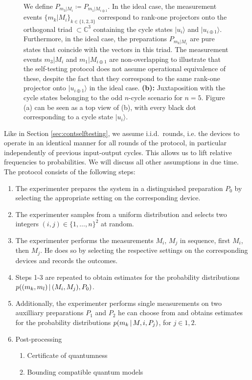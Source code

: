 \begin{figure}
{\vspace*{0.7em} 
We define $P_{m_3\vert M_i}\coloneqq P_{m_1\vert M_{i\oplus 1}}$. In the ideal case, the measurement events $\{m_k\vert M_i\}_{k\in\{1,2,3\}}$ correspond to rank-one projectors onto the orthogonal triad $\subset \mathbb{C}^3$ containing the cycle states $\vert u_i\rangle$ and $\vert u_{i\oplus 1}\rangle$. Furthermore, in the ideal case, the preparations $P_{m_k\vert M_i}$ are pure states that coincide with the vectors in this triad. The measurement events $m_3\vert M_i$ and $m_1\vert M_{i\oplus 1}$ are non-overlapping to illustrate that the self-testing protocol does not assume operational equivalence of these, despite the fact that they correspond to the same rank-one projector onto $\vert u_{i\oplus 1}\rangle$ in the ideal case. \textbf{(b):} Juxtaposition with the cycle states belonging to the odd $n$-cycle scenario for $n=5$. Figure (a) can be seen as a top view of (b), with every black dot corresponding to a cycle state $\vert u_i\rangle$.
}
\label{fig:ncycleselftesting}
\end{figure}

Like in Section \ref{sec:contselftesting}, we assume i.i.d.\ rounds, i.e. the devices to operate in an identical manner for all rounds of the protocol, in particular independently of previous input-output cycles. This allows us to lift relative frequencies to probabilities. We will discuss all other assumptions in due time. The protocol consists of the following steps:
\begin{enumerate}
\item The experimenter prepares the system in a distinguished preparation $P_0$ by selecting the appropriate setting on the corresponding device.
\item The experimenter samples from a uniform distribution and selects two integers $(i,j)\in\{1,\dots,n\}^2$ at random.
\item The experimenter performs the measurements $M_i$, $M_j$ in sequence, first $M_i$, then $M_j$. He does so by selecting the respective settings on the corresponding devices and records the outcomes.
\item Steps 1-3 are repeated to obtain estimates for the probability distributions \\ $p((m_k,m_l)\thinspace\vert\thinspace (M_i,M_j),P_0)$. 
\item Additionally, the experimenter performs single measurements on two auxilliary preparations $P_1$ and $P_2$ he can choose from and obtains estimates for the probability distributions $p(m_k\thinspace\vert\thinspace M,i, P_j)$, for $j\in{1,2}$.
\item Post-processing
	\begin{enumerate}
	\item Certificate of quantumness
	\item Bounding compatible quantum models
	\end{enumerate}
\end{enumerate}

